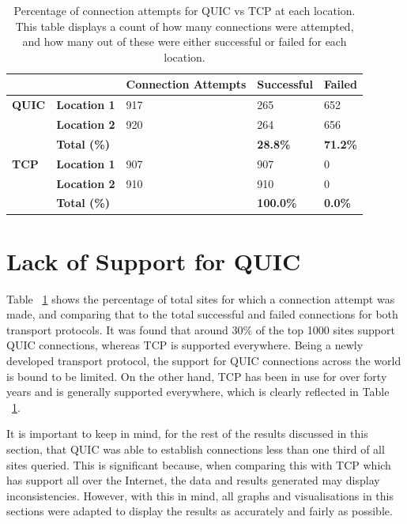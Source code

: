 \documentclass{l4proj}
\begin{document}
\begin{table}[]
    \centering
    \caption{Percentage of connection attempts for QUIC vs TCP at each location. This table displays a count of how many connections were attempted, and how many out of these were either successful or failed for each location.}\label{tab:ConnectionAttempts}
    \begin{tabular}{lll|ll}
    \textbf{}     & \textbf{}  & \textbf{Connection Attempts} & \textbf{Successful} & \textbf{Failed} \\ \hline
    \textbf{QUIC} & \textbf{Location 1}     & 917          & 265                                & 652              \\
                  & \textbf{Location 2}    & 920          & 264                                & 656              \\
                  & \textbf{Total (\%)} &        & \textbf{28.8\%}                    & \textbf{71.2\%}  \\ \hline
    \textbf{TCP}  & \textbf{Location 1}    & 907     & 907                                & 0                \\
                  & \textbf{Location 2}     & 910     & 910                                & 0                \\
                  & \textbf{Total (\%)} &          & \textbf{100.0\%}                   & \textbf{0.0\%}  
    \end{tabular}
\end{table}


\section{Lack of Support for QUIC}

Table ~\ref{tab:ConnectionAttempts} shows the percentage of total sites for which a connection attempt was made, and comparing that to the total successful and failed connections for both transport protocols. It was found that around 30\% of the top 1000 sites support QUIC connections, whereas TCP is supported everywhere. Being a newly developed transport protocol, the support for QUIC connections across the world is bound to be limited. On the other hand, TCP has been in use for over forty years and is generally supported everywhere, which is clearly reflected in Table ~\ref{tab:ConnectionAttempts}. 

It is important to keep in mind, for the rest of the results discussed in this section, that QUIC was able to establish connections less than one third of all sites queried. This is significant because, when comparing this with TCP which has support all over the Internet, the data and results generated may display inconsistencies. However, with this in mind, all graphs and visualisations in this sections were adapted to display the results as accurately and fairly as possible.
\end{document}
